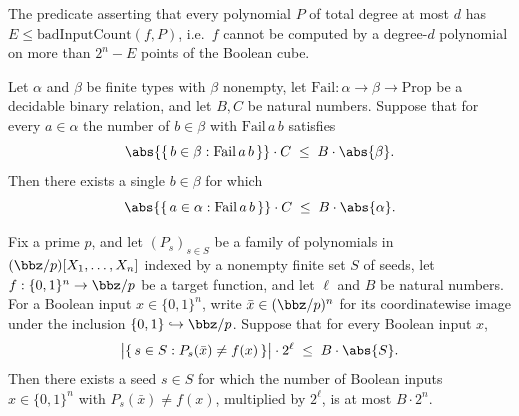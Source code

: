 \begin{definition}
\label{RazborovSmolensky.LowDegreeBadCountLB}
\leanok
{}
The predicate asserting that every polynomial $P$ of total degree at most $d$ has
$E \le \mathrm{badInputCount}(f, P)$, i.e.\ $f$ cannot be computed by a degree-$d$
polynomial on more than $2^n - E$ points of the Boolean cube.
\end{definition}

\begin{lemma}
\label{RazborovSmolensky.exists_good_parameter_of_pointwise_bound}
\leanok
{}
Let $\alpha$ and $\beta$ be finite types with $\beta$ nonempty, let $\mathrm{Fail} :
\alpha \to \beta \to \mathrm{Prop}$ be a decidable binary relation, and let $B, C$ be
natural numbers. Suppose that for every $a \in \alpha$ the number of $b \in \beta$ with
$\mathrm{Fail}\,a\,b$ satisfies
\[
\abs{\{\, b \in \beta : \mathrm{Fail}\,a\,b \,\}}\cdot C \;\le\; B\cdot\abs{\beta}.
\]
Then there exists a single $b \in \beta$ for which
\[
\abs{\{\, a \in \alpha : \mathrm{Fail}\,a\,b \,\}}\cdot C \;\le\; B\cdot\abs{\alpha}.
\]
\end{lemma}

\begin{theorem}
\label{RazborovSmolensky.exists_single_polynomial_from_pointwise_distribution}
\leanok
{}
Fix a prime $p$, and let $(P_s)_{s \in S}$ be a family of polynomials in
$(\bbz/p)[X_1,\dots,X_n]$ indexed by a nonempty finite set $S$ of seeds, let $f :
\{0,1\}^n \to \bbz/p$ be a target function, and let $\ell$ and $B$ be natural numbers.
For a Boolean input $x \in \{0,1\}^n$, write $\bar{x} \in (\bbz/p)^n$ for its
coordinatewise image under the inclusion $\{0,1\} \hookrightarrow \bbz/p$. Suppose that
for every Boolean input $x$,
\[
\bigl|\{\, s \in S : P_s(\bar{x}) \neq f(x)\,\}\bigr| \cdot 2^{\ell} \;\le\; B \cdot
\abs{S}.
\]
Then there exists a seed $s \in S$ for which the number of Boolean inputs $x \in
\{0,1\}^n$ with $P_s(\bar{x}) \neq f(x)$, multiplied by $2^{\ell}$, is at most $B \cdot
2^{n}$.
\end{theorem}

